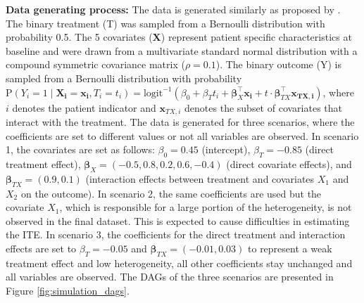 \textbf{Data generating process: } The data is generated similarly as proposed by \citet{hoogland2021}. The binary treatment (T) was sampled from a Bernoulli distribution with probability 0.5. The 5 covariates ($\mathbf{X}$) represent patient specific characteristics at baseline and were drawn from a multivariate standard normal distribution with a compound symmetric covariance matrix ($\rho=0.1$). The binary outcome (Y) is sampled from a Bernoulli distribution with probability $\text{P}(Y_i = 1 \mid  \mathbf{X_i} = \mathbf{x_i}, T_i = t_i) = \text{logit}^{-1} \left(\beta_0 + \beta_T t_i + \boldsymbol{\beta}_X^\top \mathbf{x_i} + t \cdot \boldsymbol{\beta}_{TX}^\top \mathbf{x_{TX,i}} \right)$, where $i$ denotes the patient indicator and $\mathbf{x}_{TX,i}$ denotes the subset of covariates that interact with the treatment. The data is generated for three scenarios, where the coefficients are set to different values or not all variables are observed. In scenario 1, the covariates are set as follows: $\beta_0 = 0.45$ (intercept), $\beta_T = -0.85$ (direct treatment effect), $\boldsymbol{\beta}_X = (-0.5, 0.8, 0.2, 0.6, -0.4)$ (direct covariate effects), and $\boldsymbol{\beta}_{TX} = (0.9, 0.1)$ (interaction effects between treatment and covariates $X_1$ and $X_2$ on the outcome). In scenario 2, the same coefficients are used but the covariate $X_1$, which is responsible for a large portion of the heterogeneity, is not observed in the final dataset. This is expected to cause difficulties in estimating the ITE. In scenario 3, the coefficients for the direct treatment and interaction effects are set to $\beta_T = -0.05$ and $\boldsymbol{\beta}_{TX} = (-0.01, 0.03)$ to represent a weak treatment effect and low heterogeneity, all other coefficients stay unchanged and all variables are observed. The DAGs of the three scenarios are presented in Figure \ref{fig:simulation_dags}.



